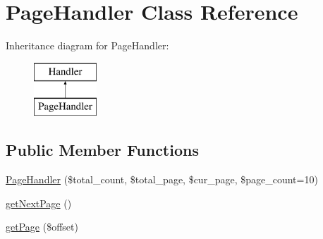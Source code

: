 \hypertarget{classPageHandler}{}\section{Page\+Handler Class Reference}
\label{classPageHandler}
Inheritance diagram for Page\+Handler\+:\begin{figure}[H]
\begin{center}
\leavevmode
\includegraphics[height=2.000000cm]{classPageHandler}
\end{center}
\end{figure}
\subsection*{Public Member Functions}
\begin{DoxyCompactItemize}
\item 
\hyperlink{classPageHandler_a98c8fc6b290d49c3880c323b263fe7e7}{Page\+Handler} (\$total\+\_\+count, \$total\+\_\+page, \$cur\+\_\+page, \$page\+\_\+count=10)
\item 
\hyperlink{classPageHandler_a259d01838d005d854d4cc263ba524de7}{get\+Next\+Page} ()
\item 
\hyperlink{classPageHandler_a971f178609a0dd6e1a0fd07daa94782d}{get\+Page} (\$offset)
\end{DoxyCompactItemize}
